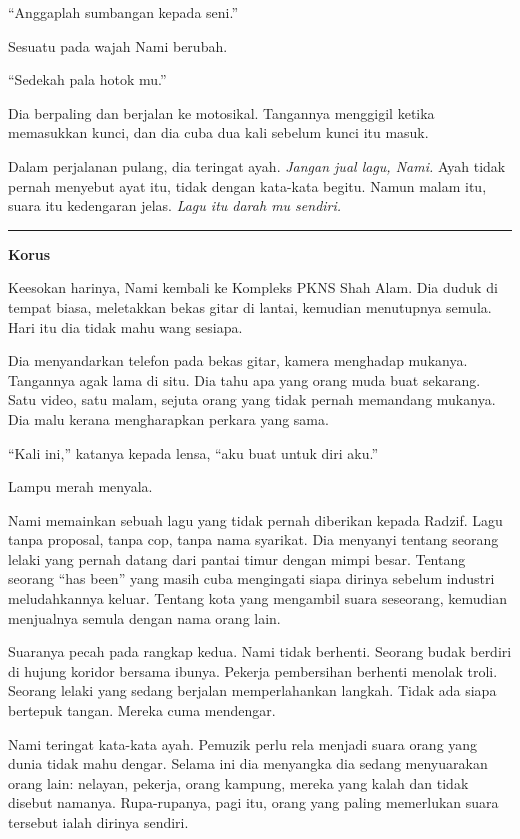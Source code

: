 \documentclass[
  11pt,
  a5paper,
  openany,
  oneside]{book}
\begin{document}
``Anggaplah sumbangan kepada seni.''

Sesuatu pada wajah Nami berubah.

``Sedekah pala hotok mu.''

Dia berpaling dan berjalan ke motosikal. Tangannya menggigil ketika
memasukkan kunci, dan dia cuba dua kali sebelum kunci itu masuk.

Dalam perjalanan pulang, dia teringat ayah. \emph{Jangan jual lagu,
Nami.} Ayah tidak pernah menyebut ayat itu, tidak dengan kata-kata
begitu. Namun malam itu, suara itu kedengaran jelas. \emph{Lagu itu
darah mu sendiri.}

\begin{center}\rule{0.5\linewidth}{0.5pt}\end{center}

\textbf{Korus}

Keesokan harinya, Nami kembali ke Kompleks PKNS Shah Alam. Dia duduk di
tempat biasa, meletakkan bekas gitar di lantai, kemudian menutupnya
semula. Hari itu dia tidak mahu wang sesiapa.

Dia menyandarkan telefon pada bekas gitar, kamera menghadap mukanya.
Tangannya agak lama di situ. Dia tahu apa yang orang muda buat sekarang.
Satu video, satu malam, sejuta orang yang tidak pernah memandang
mukanya. Dia malu kerana mengharapkan perkara yang sama.

``Kali ini,'' katanya kepada lensa, ``aku buat untuk diri aku.''

Lampu merah menyala.

Nami memainkan sebuah lagu yang tidak pernah diberikan kepada Radzif.
Lagu tanpa proposal, tanpa cop, tanpa nama syarikat. Dia menyanyi
tentang seorang lelaki yang pernah datang dari pantai timur dengan mimpi
besar. Tentang seorang ``has been'' yang masih cuba mengingati siapa
dirinya sebelum industri meludahkannya keluar. Tentang kota yang
mengambil suara seseorang, kemudian menjualnya semula dengan nama orang
lain.

Suaranya pecah pada rangkap kedua. Nami tidak berhenti. Seorang budak
berdiri di hujung koridor bersama ibunya. Pekerja pembersihan berhenti
menolak troli. Seorang lelaki yang sedang berjalan memperlahankan
langkah. Tidak ada siapa bertepuk tangan. Mereka cuma mendengar.

Nami teringat kata-kata ayah. Pemuzik perlu rela menjadi suara orang
yang dunia tidak mahu dengar. Selama ini dia menyangka dia sedang
menyuarakan orang lain: nelayan, pekerja, orang kampung, mereka yang
kalah dan tidak disebut namanya. Rupa-rupanya, pagi itu, orang yang
paling memerlukan suara tersebut ialah dirinya sendiri.
\end{document}
